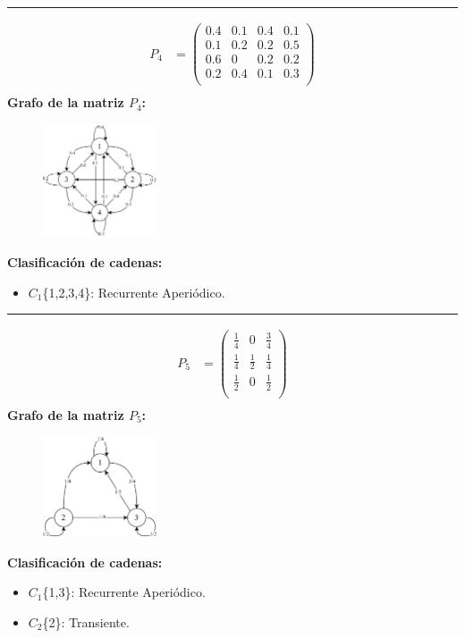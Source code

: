 \documentclass{templateNote}
\begin{document}
\begin{enumerate}
    \rule{0.8\textwidth}{0.4pt}

    \begin{align*}
        P_4 &= \left(
            \begin{array}{cccc}    
                0.4&0.1&0.4&0.1\\
                0.1&0.2&0.2&0.5\\
                0.6&0&0.2&0.2\\
                0.2&0.4&0.1&0.3\\
            \end{array}
            \right)\\
    \end{align*}
    \textbf{Grafo de la matriz $P_4$:}
    \begin{figure}[H]
        \centering
        \includegraphics[width=0.3\textwidth]{img/ejer14_2.png}
    \end{figure}
    \textbf{Clasificación de cadenas:}
    \begin{itemize}
        \item $C_1$\{1,2,3,4\}: Recurrente Aperiódico.
    \end{itemize}

    \rule{0.8\textwidth}{0.4pt}

    \begin{align*}
        P_5 &= \left(
            \begin{array}{ccc}    
                \frac{1}{4}   &  0  & \frac{3}{4}  \\
                \frac{1}{4} & \frac{1}{2} & \frac{1}{4}  \\
                \frac{1}{2} & 0 & \frac{1}{2}\\
            \end{array}
            \right)\\
    \end{align*}
    \textbf{Grafo de la matriz $P_5$:}
    \begin{figure}[H]
        \centering
        \includegraphics[width=0.3\textwidth]{img/ejer15_2.png}
    \end{figure}
    \textbf{Clasificación de cadenas:}
    \begin{itemize}
        \item $C_1$\{1,3\}: Recurrente Aperiódico.
        \item $C_2$\{2\}: Transiente.
    \end{itemize}


\end{enumerate}
\end{document}
